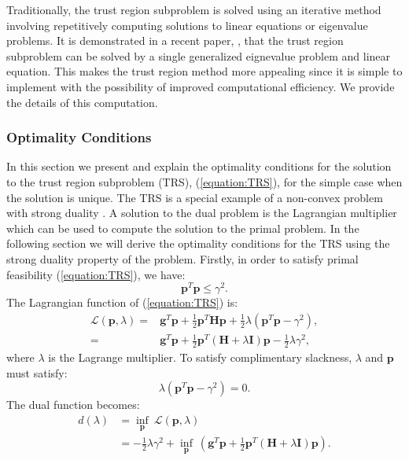 \documentclass[letterpaper,12pt,titlepage,oneside,final]{book}
\begin{document}
	Traditionally, the trust region subproblem is solved using an iterative method involving repetitively computing solutions to linear equations or eigenvalue problems. It is demonstrated in a recent paper, \cite{adachi.paper}, that the trust region subproblem can be solved by a single generalized eignevalue problem and linear equation. This makes the trust region method more appealing since it is simple to implement with the possibility of improved computational efficiency. We provide the details of this computation.  
	
	\subsubsection{Optimality Conditions}
	
	In this section we present and explain the optimality conditions for the solution to the trust region subproblem (TRS), (\ref{equation:TRS}), for the simple case when the solution is unique. The TRS is a special example of a non-convex problem with strong duality \cite{boyd}. A solution to the dual problem is the Lagrangian multiplier which can be used to compute the solution to the primal problem. In the following section we will derive the optimality conditions for the TRS using the strong duality property of the problem. Firstly, in order to satisfy primal feasibility (\ref{equation:TRS}), we have:
	\begin{equation}
	\mathbf{p}^{T}\mathbf{p} \leq \gamma^2.
	\label{equation:inbounds}
	\end{equation}
	The Lagrangian function of (\ref{equation:TRS}) is:
	\begin{equation}
	\begin{split}
	\mathcal{L}(\mathbf{p},\lambda) = &\mathbf{g}^{T}\mathbf{p} + \frac{1}{2}\mathbf{p}^{T}\mathbf{Hp} + \frac{1}{2}\lambda (\mathbf{p}^{T}\mathbf{p} - \gamma^{2}),\\ = &\mathbf{g}^{T}\mathbf{p} + \frac{1}{2}\mathbf{p}^{T}(\mathbf{H} + \lambda\mathbf{I})\mathbf{p} - \frac{1}{2}\lambda\gamma^{2},
	\label{equation:lagrangian}
	\end{split}
	\end{equation}
	where $\lambda$ is the Lagrange multiplier. To satisfy complimentary slackness, $\lambda$ and $\mathbf{p}$ must satisfy:
	\begin{equation}
	\lambda(\mathbf{p}^{T}\mathbf{p} - \gamma^{2}) = 0.
	\label{equation:complementary_slackness}
	\end{equation}
	The dual function becomes:
	\begin{equation}
	\begin{aligned}
	d(\lambda) & = \underset{\mathbf{p}}{\inf}
	\ \mathcal{L}(\mathbf{p},\lambda)  \\
	& = -\frac{1}{2}\lambda\gamma^{2} + \underset{\mathbf{p}}{\inf}
	\ (\mathbf{g}^{T}\mathbf{p} + \frac{1}{2}\mathbf{p}^{T}(\mathbf{H} + \lambda\mathbf{I})\mathbf{p}). \\
	\label{equation:dual}
	\end{aligned}
	\end{equation}
\end{document}
